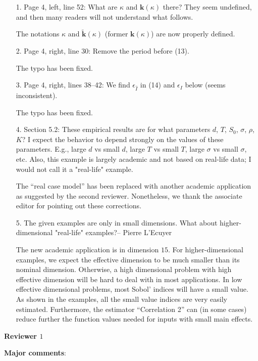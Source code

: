 \documentclass[10pt,a4paper]{article}
\newcommand{\vect}[1]{\boldsymbol{\mathbf{#1}}}
\newcommand{\vk}{\vect{k}}
\begin{document}
\begin{itemize}
\item[1.] Page 4, left, line 52: What are $\kappa$ and $\vk(\kappa)$ there? They seem undefined, and then many readers will not understand what follows.

{\color{blue} The notations $\kappa$ and $\tilde{\vk}(\kappa)$ (former $\vk(\kappa)$) are now properly defined.}
\item[2.] Page 4, right, line 30: Remove the period before (13).

{\color{blue} The typo has been fixed.}
\item[3.] Page 4, right, lines 38--42: We find $\epsilon_{\hat I}$ in (14) and $\epsilon_{I}$ below (seems inconsistent).

{\color{blue} The typo has been fixed.}
\item[4.] Section 5.2: These empirical results are for what parameters $d$, $T$, $S_0$, $\sigma$, $\rho$, $K$? I expect the behavior to depend strongly on the values of these parameters. E.g., large $d$ vs small $d$, large $T$ vs small $T$, large $\sigma$ vs small $\sigma$, etc. Also, this example is largely academic and not based on real-life data; I would not call it a "real-life" example. 

{\color{blue} The ``real case model'' has been replaced with another academic application as suggested by the second reviewer. Nonetheless, we thank the associate editor for pointing out these corrections.}
\item[5.] The given examples are only in small dimensions. What about higher-dimensional "real-life" examples?-- Pierre L'Ecuyer

{\color{blue} The new academic application is in dimension $15$. For higher-dimensional examples, we expect the effective dimension to be much smaller than its nominal dimension. Otherwise, a high dimensional problem with high effective dimension will be hard to deal with in most applications. In low effective dimensional problems, most Sobol' indices will have a small value. As shown in the examples, all the small value indices are very easily estimated. Furthermore, the estimator ``Correlation 2'' can (in some cases) reduce further the function values needed for inputs with small main effects.}
\end{itemize}




\textbf{\large{Reviewer $1$}}
\vspace*{0.5cm}

\textbf{Major comments}:
\end{document}
